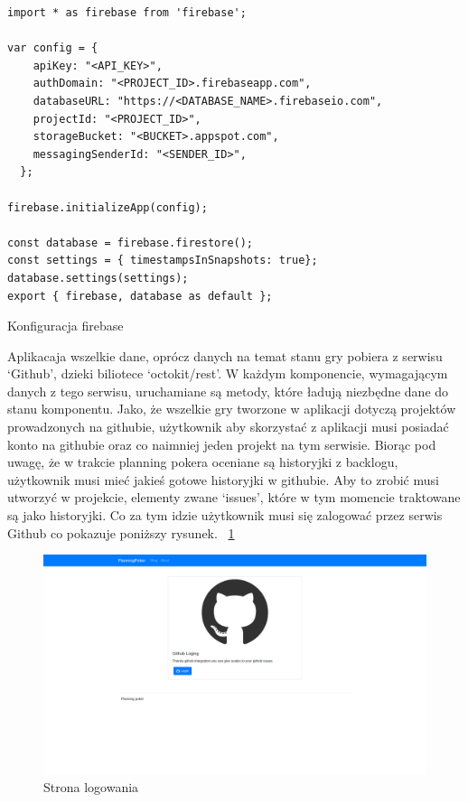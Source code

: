 \begin{listing}
	\begin{verbatim}
import * as firebase from 'firebase';

var config = {
    apiKey: "<API_KEY>",
    authDomain: "<PROJECT_ID>.firebaseapp.com",
    databaseURL: "https://<DATABASE_NAME>.firebaseio.com",
    projectId: "<PROJECT_ID>",
    storageBucket: "<BUCKET>.appspot.com",
    messagingSenderId: "<SENDER_ID>",
  };

firebase.initializeApp(config);

const database = firebase.firestore();
const settings = { timestampsInSnapshots: true};
database.settings(settings);
export { firebase, database as default };
	\end{verbatim}
	\caption{Konfiguracja firebase} \label{listing:firebaseConfig}
\end{listing}

Aplikacaja wszelkie dane, oprócz danych na temat stanu gry pobiera z serwisu `Github',
dzieki biliotece `octokit/rest'.  W każdym komponencie, wymagającym danych z tego serwisu,
uruchamiane są metody, które ładują niezbędne dane do stanu komponentu.
Jako, że wszelkie gry tworzone w aplikacji dotyczą projektów prowadzonych na githubie,
użytkownik aby skorzystać z aplikacji musi posiadać konto na githubie oraz co naimniej jeden projekt
na tym serwisie. Biorąc pod uwagę, że w trakcie planning pokera oceniane są historyjki z backlogu,
użytkownik musi mieć jakieś gotowe historyjki w githubie. Aby to zrobić musi utworzyć w projekcie,
elementy zwane `issues', które w tym momencie traktowane są jako historyjki.
Co za tym idzie użytkownik musi się zalogować przez serwis Github co pokazuje poniższy rysunek.
~\ref{rys:login} 

\begin{figure}
	\centering\includegraphics[width=.7\textwidth]{img/GitLogin}
	\caption{Strona logowania}\label{rys:login}%
\end{figure}

